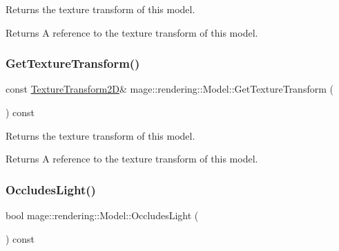 Returns the texture transform of this model.

\begin{DoxyReturn}{Returns}
A reference to the texture transform of this model. 
\end{DoxyReturn}
\mbox{\label{classmage_1_1rendering_1_1_model_a16b34be32b1c45c254a833b21f81f2df}} 
\subsubsection{\texorpdfstring{Get\+Texture\+Transform()}{GetTextureTransform()}\hspace{0.1cm}{\footnotesize\ttfamily [2/2]}}
{\footnotesize\ttfamily const \mbox{\hyperlink{classmage_1_1_texture_transform2_d}{Texture\+Transform2D}}\& mage\+::rendering\+::\+Model\+::\+Get\+Texture\+Transform (\begin{DoxyParamCaption}{ }\end{DoxyParamCaption}) const\hspace{0.3cm}{\ttfamily [noexcept]}}

Returns the texture transform of this model.

\begin{DoxyReturn}{Returns}
A reference to the texture transform of this model. 
\end{DoxyReturn}
\mbox{\label{classmage_1_1rendering_1_1_model_ac6238580ce9572b9274bf21852f73455}} 
\subsubsection{\texorpdfstring{Occludes\+Light()}{OccludesLight()}}
{\footnotesize\ttfamily bool mage\+::rendering\+::\+Model\+::\+Occludes\+Light (\begin{DoxyParamCaption}{ }\end{DoxyParamCaption}) const\hspace{0.3cm}{\ttfamily [noexcept]}}

